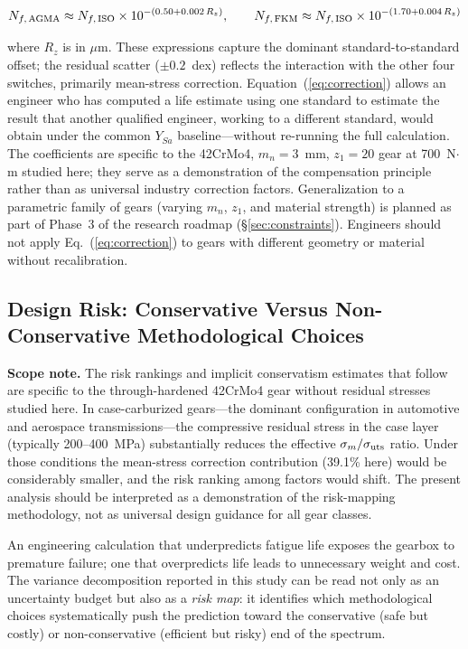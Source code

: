 \documentclass[12pt,a4paper]{article}
\begin{document}
\begin{equation}
N_{f,\,{\rm AGMA}} \approx N_{f,\,{\rm ISO}} \times 10^{-(0.50 + 0.002\,R_z)},
\qquad
N_{f,\,{\rm FKM}}  \approx N_{f,\,{\rm ISO}} \times 10^{-(1.70 + 0.004\,R_z)}
\label{eq:correction}
\end{equation}

where $R_z$ is in $\mu$m. These expressions capture the dominant
standard-to-standard offset; the residual scatter ($\pm 0.2$~dex)
reflects the interaction with the other four switches, primarily
mean-stress correction. Equation~(\ref{eq:correction}) allows an
engineer who has computed a life estimate using one standard to
estimate the result that another qualified engineer, working to a
different standard, would obtain under the common $Y_{Sa}$ baseline---without re-running the full
calculation. The coefficients are specific to the 42CrMo4, $m_n=3$~mm,
$z_1=20$ gear at 700~N$\cdot$m studied here; they serve as a
demonstration of the compensation principle rather than as universal
industry correction factors. Generalization to a parametric family of
gears (varying $m_n$, $z_1$, and material strength) is planned as part
of Phase~3 of the research roadmap (\S\ref{sec:constraints}). Engineers
should not apply Eq.~(\ref{eq:correction}) to gears with different
geometry or material without recalibration.

\subsection{Design Risk: Conservative Versus Non-Conservative Methodological Choices}

\textbf{Scope note.} The risk rankings and implicit conservatism
estimates that follow are specific to the through-hardened 42CrMo4
gear without residual stresses studied here. In case-carburized
gears---the dominant configuration in automotive and aerospace
transmissions---the compressive residual stress in the case layer
(typically 200--400~MPa) substantially reduces the effective
$\sigma_m/\sigma_{\rm uts}$ ratio. Under those conditions the
mean-stress correction contribution (39.1\% here) would be
considerably smaller, and the risk ranking among factors would shift.
The present analysis should be interpreted as a demonstration of the
risk-mapping methodology, not as universal design guidance for all
gear classes.

An engineering calculation that underpredicts fatigue life exposes the
gearbox to premature failure; one that overpredicts life leads to
unnecessary weight and cost. The variance decomposition reported in
this study can be read not only as an uncertainty budget but also as a
\emph{risk map}: it identifies which methodological choices
systematically push the prediction toward the conservative (safe but
costly) or non-conservative (efficient but risky) end of the spectrum.
\end{document}
